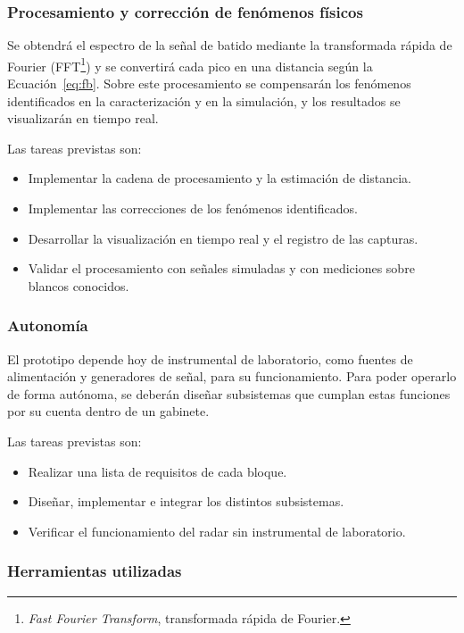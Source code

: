 \documentclass[11pt, a4paper, oneside]{article}
\newcommand{\sigla}[2]{#1\footnote{#2.}}
\begin{document}
\subsubsection{Procesamiento y corrección de fenómenos físicos}

Se obtendrá el espectro de la señal de batido mediante la transformada
rápida de Fourier (\sigla{FFT}{\textit{Fast Fourier Transform},
transformada rápida de Fourier}) y se convertirá cada pico en una
distancia según la Ecuación~\eqref{eq:fb}. Sobre este procesamiento se
compensarán los fenómenos identificados en la caracterización y en la
simulación, y los resultados se visualizarán en tiempo real.

Las tareas previstas son:
\begin{itemize}
  \item Implementar la cadena de procesamiento y la estimación de
        distancia.
  \item Implementar las correcciones de los fenómenos identificados.
  \item Desarrollar la visualización en tiempo real y el registro de
        las capturas.
  \item Validar el procesamiento con señales simuladas y con
        mediciones sobre blancos conocidos.
\end{itemize}

\subsubsection{Autonomía}

El prototipo depende hoy de instrumental de laboratorio, como fuentes
de alimentación y generadores de señal, para su funcionamiento. Para
poder operarlo de forma autónoma, se deberán diseñar subsistemas que
cumplan estas funciones por su cuenta dentro de un gabinete.

Las tareas previstas son:
\begin{itemize}
  \item Realizar una lista de requisitos de cada bloque.
  \item Diseñar, implementar e integrar los distintos subsistemas.
  \item Verificar el funcionamiento del radar sin instrumental de
        laboratorio.
\end{itemize}

\subsubsection{Herramientas utilizadas}
\end{document}

